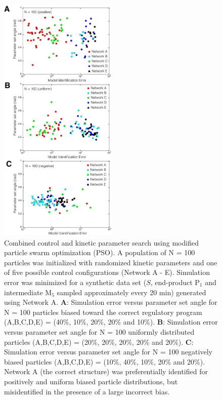 \documentclass[12pt]{article}
\begin{document}
\begin{figure}
\centering
\includegraphics[width=0.5\textwidth]{./figs/Figure-7-ControlSearch.pdf}
\caption{Combined control and kinetic parameter search using modified particle swarm optimization (PSO). 
A population of N = 100 particles was initialized with randomized kinetic parameters and one of five possible control configurations (Network A - E).
Simulation error was minimized for a synthetic data set 
($S$, end-product P$_{1}$ and intermediate M$_5$ sampled approximately every 20 min) generated using Network A.
\textbf{A}: Simulation error versus parameter set angle for N = 100 particles biased toward the correct regulatory program (A,B,C,D,E) = (40\%, 10\%, 20\%, 20\% and 10\%).
\textbf{B}: Simulation error versus parameter set angle for N = 100 uniformly distributed particles (A,B,C,D,E) = (20\%, 20\%, 20\%, 20\% and 20\%).
\textbf{C}: Simulation error versus parameter set angle for N = 100 negatively biased particles (A,B,C,D,E) = (10\%, 40\%, 10\%, 20\% and 20\%).
Network A (the correct structure) was preferentially identified for positively and uniform biased particle distributions, but misidentified in the presence of
a large incorrect bias. 
}\label{fig-control-search}
\end{figure}
\end{document}
